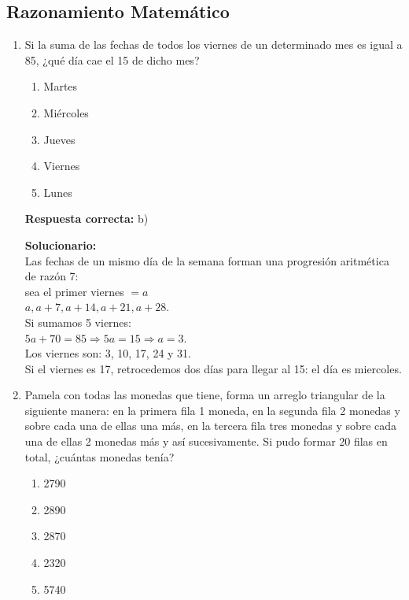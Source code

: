 \subsection*{Razonamiento Matemático}

\begin{enumerate}



\item Si la suma de las fechas de todos los viernes de un determinado mes es igual a 85, ¿qué día cae el 15 de dicho mes?

\begin{enumerate}[label=\alph*)]
	\item Martes
	\item Miércoles
	\item Jueves
	\item Viernes
	\item Lunes
\end{enumerate}

\textbf{Respuesta correcta:} b)

\vspace{2mm}
\textbf{Solucionario:}\\
Las fechas de un mismo día de la semana forman una progresión aritmética de razón 7:\\
sea el primer viernes $= a$\\
 $a, a+7, a+14, a+21, a+28$.\\
Si sumamos 5 viernes: \\
$5a + 70 = 85 \Rightarrow 5a = 15 \Rightarrow a = 3$.\\
Los viernes son: 3, 10, 17, 24 y 31.\\
Si el viernes es 17, retrocedemos dos días para llegar al 15: el día es miercoles.

\vspace{6mm}

\item Pamela con todas las monedas que tiene, forma un arreglo triangular de la siguiente manera: en la primera fila 1 moneda, en la segunda fila 2 monedas y sobre cada una de ellas una más, en la tercera fila tres monedas y sobre cada una de ellas 2 monedas más y así sucesivamente. Si pudo formar 20 filas en total, ¿cuántas monedas tenía?

\begin{enumerate}[label=\alph*)]
	\item 2790
	\item 2890
	\item 2870
	\item 2320
	\item 5740
\end{enumerate}


\end{enumerate}
